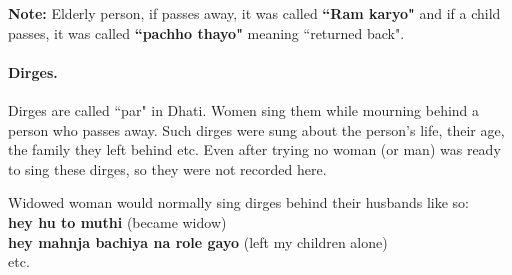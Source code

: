 \textbf{Note:} Elderly person, if passes away, it was called \textbf{``Ram
karyo"} and if a child passes, it was called \textbf{``pachho thayo"} meaning
``returned back".

\paragraph{Dirges.}
Dirges are called ``par" in Dhati. Women sing them while mourning behind a
person who passes away. Such dirges were sung about the person's life, their
age, the family they left behind etc. Even after trying no woman (or man) was
ready to sing these dirges, so they were not recorded here.

Widowed woman would normally sing dirges behind their husbands like so:\\
\textbf{hey hu to muthi} (became widow)\\
\textbf{hey mahnja bachiya na role gayo} (left my children alone)\\
etc.


